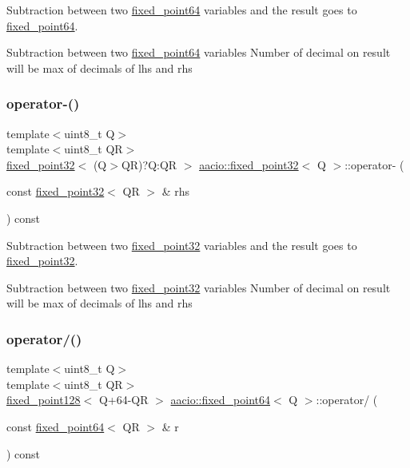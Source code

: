 Subtraction between two \mbox{\hyperlink{structaacio_1_1fixed__point64}{fixed\+\_\+point64}} variables and the result goes to \mbox{\hyperlink{structaacio_1_1fixed__point64}{fixed\+\_\+point64}}. 

Subtraction between two \mbox{\hyperlink{structaacio_1_1fixed__point64}{fixed\+\_\+point64}} variables Number of decimal on result will be max of decimals of lhs and rhs \mbox{\label{group__fixedpoint_ga3dba31f55ab94161ac1db5c7dda2e1ee}} 
\subsubsection{\texorpdfstring{operator-\/()}{operator-()}\hspace{0.1cm}{\footnotesize\ttfamily [2/2]}}
{\footnotesize\ttfamily template$<$uint8\+\_\+t Q$>$ \\
template$<$uint8\+\_\+t QR$>$ \\
\mbox{\hyperlink{structaacio_1_1fixed__point32}{fixed\+\_\+point32}}$<$ (Q$>$QR)?Q\+:\+QR $>$ \mbox{\hyperlink{structaacio_1_1fixed__point32}{aacio\+::fixed\+\_\+point32}}$<$ Q $>$\+::operator-\/ (\begin{DoxyParamCaption}\item[{const \mbox{\hyperlink{structaacio_1_1fixed__point32}{fixed\+\_\+point32}}$<$ QR $>$ \&}]{rhs }\end{DoxyParamCaption}) const}



Subtraction between two \mbox{\hyperlink{structaacio_1_1fixed__point32}{fixed\+\_\+point32}} variables and the result goes to \mbox{\hyperlink{structaacio_1_1fixed__point32}{fixed\+\_\+point32}}. 

Subtraction between two \mbox{\hyperlink{structaacio_1_1fixed__point32}{fixed\+\_\+point32}} variables Number of decimal on result will be max of decimals of lhs and rhs \mbox{\label{group__fixedpoint_gadee229420aa1db314948b0664323ba9c}} 
\subsubsection{\texorpdfstring{operator/()}{operator/()}\hspace{0.1cm}{\footnotesize\ttfamily [1/2]}}
{\footnotesize\ttfamily template$<$uint8\+\_\+t Q$>$ \\
template$<$uint8\+\_\+t QR$>$ \\
\mbox{\hyperlink{structaacio_1_1fixed__point128}{fixed\+\_\+point128}}$<$ Q+64-\/QR $>$ \mbox{\hyperlink{structaacio_1_1fixed__point64}{aacio\+::fixed\+\_\+point64}}$<$ Q $>$\+::operator/ (\begin{DoxyParamCaption}\item[{const \mbox{\hyperlink{structaacio_1_1fixed__point64}{fixed\+\_\+point64}}$<$ QR $>$ \&}]{r }\end{DoxyParamCaption}) const}



